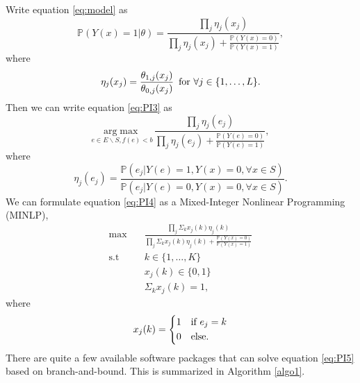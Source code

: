 \documentclass[11pt]{article}
\newcommand{\Prob}{\mathbb{P}}
\begin{document}
Write equation \eqref{eq:model} as
\begin{equation} \label{model1}
\Prob\left(Y(x) = 1 | \theta\right) =
\frac{\prod_j \eta_j(x_j)}{\prod_j \eta_j(x_j) + \frac{\Prob(Y(x)=0)}{\Prob(Y(x)=1)}},
\end{equation}
where
\begin{equation*}
\eta_j(x_j) = \frac{\theta_{1,j}(x_j)}{\theta_{0,j}(x_j)} \text{\,\,\,for $\forall j \in \{1,\ldots,L\}$}. 
\end{equation*}
Then we can write equation \eqref{eq:PI3} as
\begin{equation} \label{eq:PI4}
\underset{e \in E \backslash S, f(e)<b}{\mathrm{arg}\max} \, \frac{\prod_j \eta_j(e_j)}{\prod_j \eta_j(e_j) + \frac{\Prob(Y(e)=0)}{\Prob(Y(e)=1)}},
\end{equation}
where 
\begin{equation*}
\eta_j(e_j)=\frac{\Prob(e_j|Y(e)=1,Y(x)=0, \forall x \in S)}{\Prob(e_j|Y(e)=0,Y(x)=0, \forall x \in S)}.
\end{equation*}
We can formulate equation \eqref{eq:PI4} as a Mixed-Integer Nonlinear Programming (MINLP),
\begin{equation} \label{eq:PI5}
\begin{split}
\max \quad &\frac{\prod_j \Sigma_k x_j(k) \eta_j(k)}{\prod_j \Sigma_k x_j(k) \eta_j(k) + \frac{\Prob(Y(x)=0)}{\Prob(Y(x)=1)}} \\
\text{s.t} \quad &k \in \{1,\ldots,K\} \\
&x_j(k) \in \{0,1\}\\
&\Sigma_k x_j(k)=1,
\end{split}
\end{equation}
where
\begin{equation*}
x_j(k)=\begin{dcases}
        1 & \text{if $e_j=k$}\\
        0 & \text{else}.
\end{dcases}
\end{equation*}
There are quite a few available software packages that can solve equation \eqref{eq:PI5} based on branch-and-bound. This is summarized in Algorithm \ref{algo1}.
\end{document}
